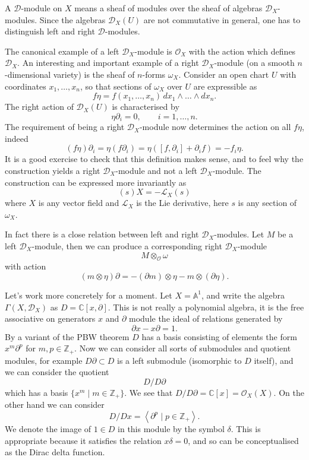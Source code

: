 \documentclass[12pt]{article}
\theoremstyle{plain}
\theoremstyle{definition}
\numberwithin{equation}{section}
\newcommand{\bbA}{\mathbb{A}}
\newcommand{\C}{\mathbb{C}}
\newcommand{\Z}{\mathbb{Z}}
\newcommand{\CD}{\mathcal{D}}
\newcommand{\CL}{\mathcal{L}}
\newcommand{\OO}{\mathcal{O}}
\begin{document}
A $\CD$-module on $X$ means a sheaf of modules over the sheaf of algebras $\CD_X$-modules. Since the algebras $\CD_X(U)$ are not commutative in general, one has to distinguish left and right $\CD$-modules.




The canonical example of a left $\CD_X$-module is $\OO_X$ with the action which defines $\CD_X$. An interesting and important example of a right $\CD_X$-module (on a smooth $n$-dimensional variety) is the sheaf of $n$-forms $\omega_X$. Consider an open chart $U$ with coordinates $x_1, \ldots, x_n$, so that sections of $\omega_X$ over $U$ are expressible as
\[
f \eta = f(x_1, \ldots, x_n) \, dx_1 \wedge \ldots \wedge dx_n.
\]
The right action of $\CD_X(U)$ is characterised by
\[
\eta \partial_i = 0, \qquad i = 1, \ldots, n.
\]
The requirement of being a right $\CD_X$-module now determines the action on all $f \eta$, indeed
\[
(f \eta) \partial_i = \eta (f \partial_i) = \eta ([f, \partial_i] + \partial_i f) = -f_i \eta.
\]
It is a good exercise to check that this definition makes sense, and to feel why the construction yields a right $\CD_X$-module and not a left $\CD_X$-module. The construction can be expressed more invariantly as
\[
(s)X = -\CL_X(s)
\]
where $X$ is any vector field and $\CL_X$ is the Lie derivative, here $s$ is any section of $\omega_X$.


In fact there is a close relation between left and right $\CD_X$-modules. Let $M$ be a left $\CD_X$-module, then we can produce a corresponding right $\CD_X$-module
\[
M \otimes_{\OO} \omega
\]
with action
\[
(m \otimes \eta) \partial = -(\partial m) \otimes \eta - m \otimes (\partial \eta).
\]



Let's work more concretely for a moment. Let $X = \bbA^1$, and write the algebra $\Gamma(X, \CD_X)$ as $D = \C[x, \partial]$. This is not really a polynomial algebra, it is the free associative on generators $x$ and $\partial$ module the ideal of relations generated by
\[
\partial x - x \partial = 1.
\]
By a variant of the PBW theorem $D$ has a basis consisting of elements the form $x^m \partial^p$ for $m, p \in \Z_+$. Now we can consider all sorts of submodules and quotient modules, for example $D \partial \subset D$ is a left submodule (isomorphic to $D$ itself), and we can consider the quotient
\[
D / D\partial
\]
which has a basis $\{ x^m \mid m \in \Z_+\}$. We see that $D / D\partial = \C[x] = \OO_X(X)$. On the other hand we can consider
\[
D / Dx = \left< \partial^p \mid p \in \Z_+ \right>.
\]
We denote the image of $1 \in D$ in this module by the symbol $\delta$. This is appropriate because it satisfies the relation $x \delta = 0$, and so can be conceptualised as the Dirac delta function.
\end{document}

